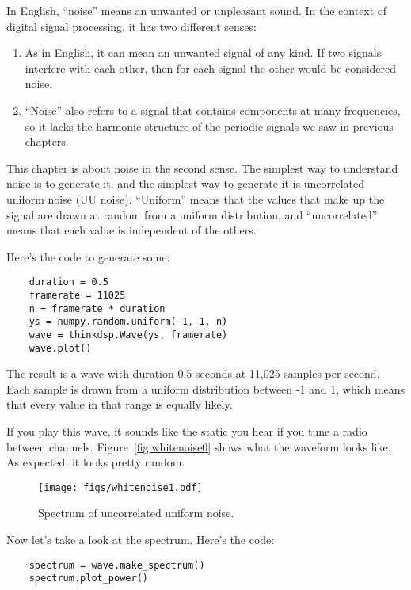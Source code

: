 \documentclass[12pt]{book}
\begin{document}
In English, ``noise'' means an unwanted or unpleasant sound.  In the
context of digital signal processing, it has two different senses:

\begin{enumerate}

\item As in English, it can mean an unwanted signal of any kind.  If
two signals interfere with each other, then for each signal the other
would be considered noise.

\item ``Noise'' also refers to a signal that contains components at
many frequencies, so it lacks the harmonic structure of the periodic
signals we saw in previous chapters.  

\end{enumerate}

This chapter is about noise in the second sense.  The simplest way
to understand noise is to generate it, and the simplest way to generate
it is uncorrelated uniform noise (UU noise).  ``Uniform'' means that the values
that make up the signal are drawn at random from a uniform distribution,
and ``uncorrelated'' means that each value is independent of the others.

Here's the code to generate some:

\begin{verbatim}
    duration = 0.5
    framerate = 11025
    n = framerate * duration
    ys = numpy.random.uniform(-1, 1, n)
    wave = thinkdsp.Wave(ys, framerate)
    wave.plot()
\end{verbatim}

The result is a wave with duration 0.5 seconds at 11,025
samples per second.  Each sample is drawn from a uniform distribution
between -1 and 1, which means that every value in that range is
equally likely.

If you play this wave, it sounds like the static you hear if you tune
a radio between channels.  Figure~\ref{fig.whitenoise0} shows what the
waveform looks like.  As expected, it looks pretty random.

\begin{figure}
\centerline{\texttt{[image: figs/whitenoise1.pdf]}}
\caption{Spectrum of uncorrelated uniform noise.}
\label{fig.whitenoise1}
\end{figure}

Now let's take a look at the spectrum.  Here's the code:

\begin{verbatim}
    spectrum = wave.make_spectrum()
    spectrum.plot_power()
\end{verbatim}
\end{document}
